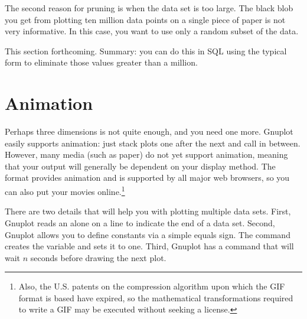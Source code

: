 The second reason for pruning is when the data set is too large. The black
blob you get from plotting ten million data points on a single piece of
paper is not very informative. In this case, you want to use only a
random subset of the data.

This section forthcoming. Summary: you can do this in SQL using the
typical  form to eliminate
those values greater than a million. 



\section{Animation} Perhaps three dimensions is not
quite enough, and you need one more. Gnuplot easily supports animation:
just stack plots one after the next and call  in between. However,
many media (such as paper) do not yet support animation, meaning that your
output will generally be dependent on your display method. The  format
provides animation and is supported by all major web browsers, so you
can also put your movies online.\footnote{Also, the U.S. patents on the
compression algorithm upon which the GIF format is based \citep{welch:lzw}
have expired, so the mathematical transformations required to write a
GIF may be executed without seeking a license.}

There are two details that will help you with plotting multiple data
sets. First, Gnuplot reads an  alone on a line to indicate the end
of a data set. Second, Gnuplot allows you to define constants via a
simple equals sign. The command  creates the variable 
and sets it to one. Third, Gnuplot has a  command that will
wait $n$ seconds before drawing the next plot. 

